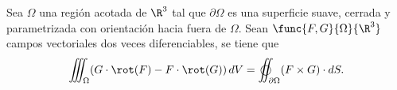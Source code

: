 \documentclass[a4,11pt]{aleph-notas}
\begin{document}
\begin{prop}
    Sea $\Omega$ una región acotada de $\R^3$ tal que $\partial \Omega$ es una superficie suave, cerrada y parametrizada con orientación hacia fuera de $\Omega$. Sean $\func{F,G}{\Omega}{\R^3}$ campos vectoriales dos veces diferenciables, se tiene que
    \[
        \iiint_{\Omega} (G \cdot \rot(F) - F \cdot \rot(G))\, dV
        = \varoiint_{\partial \Omega}  (F\times G) \cdot dS.
    \]
\end{prop}
\end{document}
